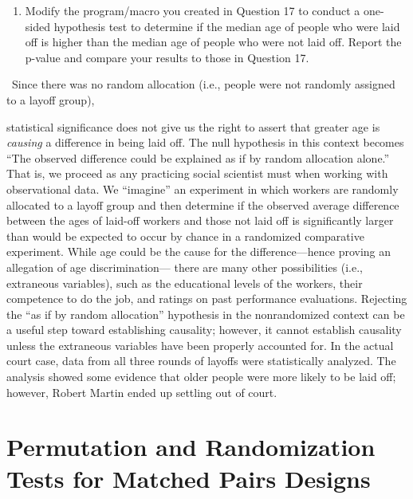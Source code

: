 \documentclass[
]{report}
\providecommand{\tightlist}{%
  \setlength{\itemsep}{0pt}\setlength{\parskip}{0pt}}
\theoremstyle{definition}
\theoremstyle{definition}
\theoremstyle{definition}
\theoremstyle{definition}
\theoremstyle{remark}
\begin{document}
\begin{enumerate}
\def\labelenumi{\arabic{enumi}.}
\setcounter{enumi}{17}
\tightlist
\item
  Modify the program/macro you created in Question 17 to conduct a one-sided hypothesis test to determine
  if the median age of people who were laid off is higher than the median age of people who were
  not laid off. Report the p-value and compare your results to those in Question 17.
\end{enumerate}

~Since there was no random allocation (i.e., people were not randomly assigned to a layoff group),

statistical significance does not give us the right to assert that greater age is \emph{causing} a difference in being
laid off. The null hypothesis in this context becomes ``The observed difference could be explained as if
by random allocation alone.'' That is, we proceed as any practicing social scientist must when working
with observational data. We ``imagine'' an experiment in which workers are randomly allocated to a
layoff group and then determine if the observed average difference between the ages of laid-off workers
and those not laid off is significantly larger than would be expected to occur by chance in a randomized
comparative experiment.
\textbar{} While age could be the cause for the difference---hence proving an allegation of age discrimination---
there are many other possibilities (i.e., extraneous variables), such as the educational levels of the
workers, their competence to do the job, and ratings on past performance evaluations. Rejecting the
``as if by random allocation'' hypothesis in the nonrandomized context can be a useful step toward
establishing causality; however, it cannot establish causality unless the extraneous variables have been
properly accounted for.
\textbar{} In the actual court case, data from all three rounds of layoffs were statistically analyzed. The analysis
showed some evidence that older people were more likely to be laid off; however, Robert Martin ended up
settling out of court.

\hypertarget{permutation-and-randomization-tests-for-matched-pairs-designs}{%
\section{\texorpdfstring{\textbf{Permutation and Randomization Tests for Matched Pairs Designs}}{Permutation and Randomization Tests for Matched Pairs Designs}}\label{permutation-and-randomization-tests-for-matched-pairs-designs}}
\end{document}
